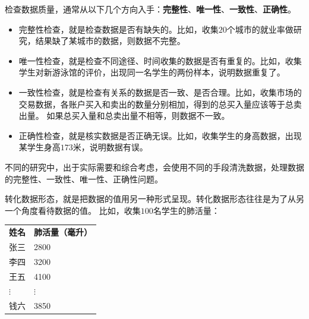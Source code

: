 \documentclass[12pt,UTF8]{ctexbook}
\begin{document}
检查数据质量，通常从以下几个方向入手：\textbf{完整性}、\textbf{唯一性}、\textbf{一致性}、\textbf{正确性}。
\begin{itemize}
    \item 完整性检查，就是检查数据是否有缺失的。比如，收集$20$个城市的就业率做研究，结果缺了某城市的数据，则数据不完整。
    \item 唯一性检查，就是检查不同途径、时间收集的数据是否有重复的。比如，收集学生对新游泳馆的评价，出现同一名学生的两份样本，说明数据重复了。
    \item 一致性检查，就是检查有关系的数据是否一致、是否合理。比如，收集市场的交易数据，各账户买入和卖出的数量分别相加，得到的总买入量应该等于总卖出量。
    如果总买入量和总卖出量不相等，则数据不一致。
    \item 正确性检查，就是核实数据是否正确无误。比如，收集学生的身高数据，出现某学生身高$173$米，说明数据有误。
\end{itemize}
不同的研究中，出于实际需要和综合考虑，会使用不同的手段清洗数据，处理数据的完整性、一致性、唯一性、正确性问题。

转化数据形态，就是把数据的值用另一种形式呈现。转化数据形态往往是为了从另一个角度看待数据的值。
比如，收集$100$名学生的肺活量：
\begin{center}
    \begin{tabular}{ p{3em}<{\centering} !{\color{white} \vrule width 2pt} p{7em}<{\centering} }
         \textbf{姓名} & \textbf{肺活量（毫升）} \\ [0.5ex] 
         张三 & 2800 \\  
         李四 & 3200 \\
         王五 & 4100 \\  
         $\vdots$ & $\vdots$ \\  
         钱六 & 3850 \\
    \end{tabular}
\end{center}
\end{document}
